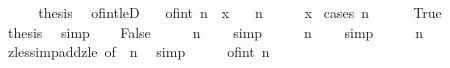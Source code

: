 \begin{isabellebody}
\ \ \isamarkupfalse%
\ \isamarkupfalse%
\ {\isacharquery}{\kern0pt}thesis\ \isacommand{{\isachardot}{\kern0pt}{\isachardot}{\kern0pt}}\isamarkupfalse%
\isanewline
{}\isamarkupfalse%
%
\endisatagproof
{\isafoldproof}%
%
\isadelimproof
\isanewline
%
\endisadelimproof
\isanewline
{}\isamarkupfalse%
\ of{\isacharunderscore}{\kern0pt}int{\isacharunderscore}{\kern0pt}leD{\isacharcolon}{\kern0pt}\isanewline
\ \ \ {\isachardoublequoteopen}{\isasymbar}of{\isacharunderscore}{\kern0pt}int\ n{\isasymbar}\ {\isasymle}\ x{\isachardoublequoteclose}\isanewline
\ \ \ {\isachardoublequoteopen}n\ {\isacharequal}{\kern0pt}\ {}\ {\isasymor}\ {}\ {\isasymle}\ x{\isachardoublequoteclose}\isanewline
%
\isadelimproof
%
\endisadelimproof
%
\isatagproof
{}\isamarkupfalse%
\ {\isacharparenleft}{\kern0pt}cases\ {\isachardoublequoteopen}n\ {\isacharequal}{\kern0pt}\ {}{\isachardoublequoteclose}{\isacharparenright}{\kern0pt}\isanewline
\ \ \isamarkupfalse%
\ True\isanewline
\ \ \isamarkupfalse%
\ \isamarkupfalse%
\ {\isacharquery}{\kern0pt}thesis\ \isamarkupfalse%
\ simp\isanewline
{}\isamarkupfalse%
\isanewline
\ \ \isamarkupfalse%
\ False\isanewline
\ \ \isamarkupfalse%
\ \isamarkupfalse%
\ {\isachardoublequoteopen}{\isasymbar}n{\isasymbar}\ {\isasymnoteq}\ {}{\isachardoublequoteclose}\ \isamarkupfalse%
\ simp\isanewline
\ \ \isamarkupfalse%
\ \isamarkupfalse%
\ {\isachardoublequoteopen}{\isasymbar}n{\isasymbar}\ {\isachargreater}{\kern0pt}\ {}{\isachardoublequoteclose}\ \isamarkupfalse%
\ simp\isanewline
\ \ \isamarkupfalse%
\ \isamarkupfalse%
\ {\isachardoublequoteopen}{\isasymbar}n{\isasymbar}\ {\isasymge}\ {}{\isachardoublequoteclose}\isanewline
\ \ \ \ \isamarkupfalse%
\ zless{\isacharunderscore}{\kern0pt}imp{\isacharunderscore}{\kern0pt}add{}{\isacharunderscore}{\kern0pt}zle\ {\isacharbrackleft}{\kern0pt}of\ {}\ {\isachardoublequoteopen}{\isasymbar}n{\isasymbar}{\isachardoublequoteclose}{\isacharbrackright}{\kern0pt}\ \isamarkupfalse%
\ simp\isanewline
\ \ \isamarkupfalse%
\ \isamarkupfalse%
\ {\isachardoublequoteopen}{\isasymbar}of{\isacharunderscore}{\kern0pt}int\ n{\isasymbar}\ {\isasymge}\ {}{\isachardoublequoteclose}\isanewline

\end{isabellebody}
